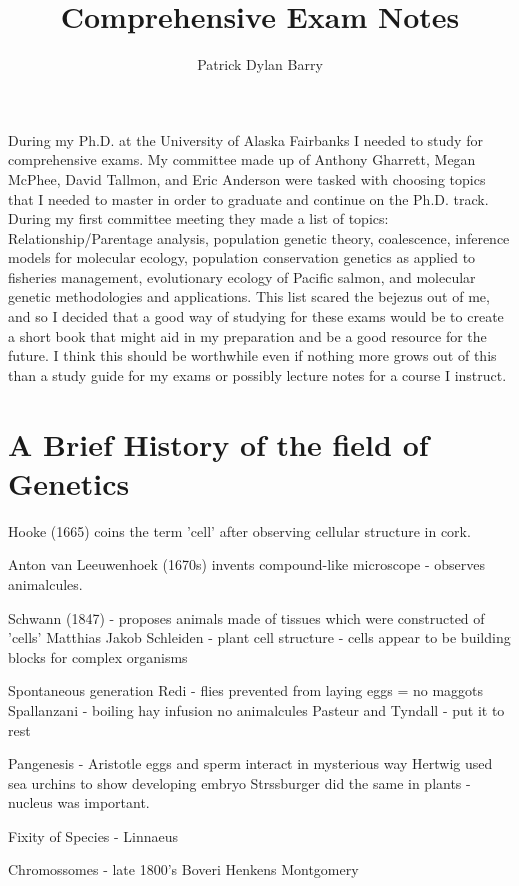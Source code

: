 \documentclass[11pt, oneside]{article}
\title{Comprehensive Exam Notes}
\author{Patrick Dylan Barry}
\begin{document}
\maketitle
\abstract{}
During my Ph.D. at the University of Alaska Fairbanks I needed to study for comprehensive exams.
My committee made up of Anthony Gharrett, Megan McPhee, David Tallmon, and Eric Anderson 
were tasked with choosing topics that I needed to master in order to graduate and continue on the 
Ph.D. track. During my first committee meeting they made a list of topics: Relationship/Parentage analysis,
population genetic theory, coalescence, inference models for molecular ecology, population conservation 
genetics as applied to fisheries management, evolutionary ecology of Pacific salmon, and molecular genetic 
methodologies and applications. This list scared the bejezus out of me, and so I decided 
 that a good way of studying for these exams would be to create a short book that 
might aid in my preparation and be a good resource for the future. I think this should be worthwhile even
if nothing more grows out of this than a study guide for my exams or possibly lecture notes for a course I 
instruct. 
\newpage

\tableofcontents

\newpage

\section{A Brief History of the field of Genetics}
Hooke (1665) coins the term 'cell' after observing cellular structure in cork.

Anton van Leeuwenhoek (1670s) invents compound-like microscope - observes animalcules.

Schwann (1847) - proposes animals made of tissues which were constructed of 'cells'
Matthias Jakob Schleiden - plant cell structure - cells appear to be building blocks for complex organisms

Spontaneous generation
Redi - flies prevented from laying eggs = no maggots
Spallanzani - boiling hay infusion no animalcules
Pasteur and Tyndall - put it to rest
 
 Pangenesis -
 Aristotle eggs and sperm interact in mysterious way
 Hertwig used sea urchins to show developing embryo
 Strssburger did the same in plants - nucleus was important. 
 
 Fixity of Species - Linnaeus 
 
 Chromossomes - late 1800's 
 Boveri
 Henkens
 Montgomery
 
\end{document}
